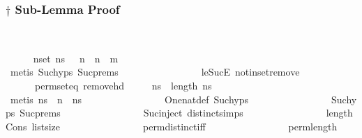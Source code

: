 \documentclass{beamer}
\begin{document}
\subsubsection{$\dagger$ Sub-Lemma Proof}
\begin{frame}{\insertsubsectionhead\
    \textemdash\ \insertsubsubsectionhead}

  \begin{tcolorbox}
    \begin{isabellebody}
      \ \ \ \ \isamarkupfalse%
      \ {\isachardoublequoteopen}{\isasymforall}n{\isasymin}set\
      ns{\isacharprime}{\isachardot}\ {}\ {\isacharless}\
      n\ {\isasymand}\ n\ {\isasymle}\
      m{\isachardoublequoteclose}\isanewline \ \ \ \ \ \
      \isamarkupfalse%
      \ {\isacharparenleft}metis\
      Suc{\isachardot}hyps{\isacharparenleft}{}{\isacharparenright}\
      Suc{\isachardot}prems{\isacharparenleft}{}{\isacharparenright}\
      \isanewline \ \ \ \ \ \ \ \ \ \ \ \ \ \ \ \
      le{\isacharunderscore}SucE\
      notin{\isacharunderscore}set{\isacharunderscore}remove{}\
      \isanewline \ \ \ \ \ \ \ \ \ \ \ \ \ \ \ \
      perm{\isacharunderscore}set{\isacharunderscore}eq\
      remove{\isacharunderscore}hd{\isacharparenright}\isanewline \ \
      \ \ \isamarkupfalse%
      \ {\isachardoublequoteopen}ns{\isacharprime}\ {\isasymsimeq}\
      {\isacharbrackleft}{}{\isachardot}{\isachardot}{\isacharless}length\
      ns{\isacharbrackright}{\isachardoublequoteclose}\isanewline \ \
      \ \ \ \ \isamarkupfalse%
      \ {\isacharparenleft}metis\ {\isacartoucheopen}ns\
      {\isasymsimeq}\ n\ {\isacharhash}\
      ns{\isacharprime}{\isacartoucheclose}\ \isanewline \ \ \ \ \ \ \
      \ \ \ \ \ \ \ \ \
      One{\isacharunderscore}nat{\isacharunderscore}def\
      Suc{\isachardot}hyps{\isacharparenleft}{}{\isacharparenright}\
      \isanewline \ \ \ \ \ \ \ \ \ \ \ \ \ \ \ \
      Suc{\isachardot}hyps{\isacharparenleft}{}{\isacharparenright}\
      Suc{\isachardot}prems{\isacharparenleft}{}{\isacharparenright}\
      \isanewline \ \ \ \ \ \ \ \ \ \ \ \ \ \ \ \
      Suc{\isacharunderscore}inject\
      distinct{\isachardot}simps{\isacharparenleft}{}{\isacharparenright}\
      \isanewline \ \ \ \ \ \ \ \ \ \ \ \ \ \ \ \
      length{\isacharunderscore}Cons\
      list{\isachardot}size{\isacharparenleft}{}{\isacharparenright}\
      \isanewline \ \ \ \ \ \ \ \ \ \ \ \ \ \ \ \
      perm{\isacharunderscore}distinct{\isacharunderscore}iff\
      \isanewline \ \ \ \ \ \ \ \ \ \ \ \ \ \ \ \
      perm{\isacharunderscore}length{\isacharparenright}
    \end{isabellebody}
  \end{tcolorbox}


\end{frame}
\end{document}
